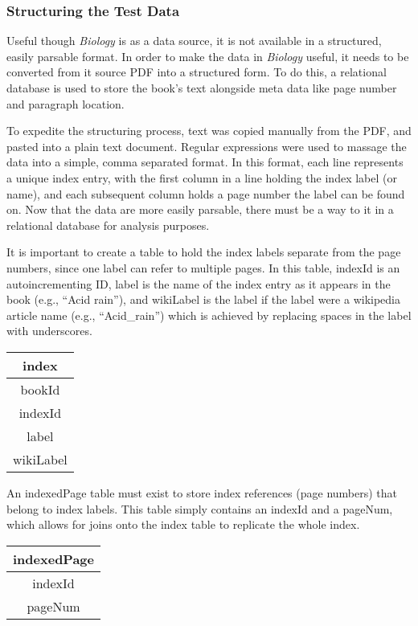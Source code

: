 \subsubsection{Structuring the Test Data}

Useful though {\it Biology} is as a data source, it is not available in a structured, easily parsable format.
In order to make the data in {\it Biology} useful, it needs to be converted from it source PDF into a structured form.
To do this, a relational database is used to store the book’s text alongside meta data like page number and paragraph location.


To expedite the structuring process, text was copied manually from the PDF, and pasted into a plain text document.
Regular expressions were used to massage the data into a simple, comma separated format.
In this format, each line represents a unique index entry, with the first column in a line holding the index label (or name), and each subsequent column holds a page number the label can be found on.
Now that the data are more easily parsable, there must be a way to it in a relational database for analysis purposes.

It is important to create a table to hold the index labels separate from the page numbers, since one label can refer to multiple pages.
In this table, indexId is an autoincrementing ID, label is the name of the index entry as it appears in the book (e.g., “Acid rain”), and wikiLabel is the label if the label were a wikipedia article name (e.g., “Acid\_rain”) which is achieved by replacing spaces in the label with underscores.

\begin{center}
\begin{tabular}{|c|}
\hline 
\textbf{index} \\ 
\hline 
bookId \\ 
\hline 
indexId \\ 
\hline 
label \\ 
\hline 
wikiLabel \\ 
\hline 
\end{tabular}
\end{center}
 
An indexedPage table must exist to store index references (page numbers) that belong to index labels.
This table simply contains an indexId and a pageNum, which allows for joins onto the index table to replicate the whole index.

\begin{center}
\begin{tabular}{|c|}
\hline 
\textbf{indexedPage} \\ 
\hline 
indexId \\ 
\hline 
pageNum \\ 
\hline 
\end{tabular} 
\end{center}


